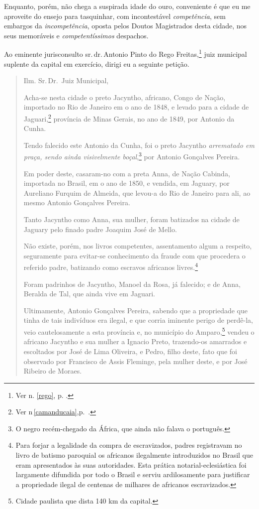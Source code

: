 Enquanto, porém, não chega a suspirada idade do ouro, conveniente é que
eu me aproveite do ensejo para tasquinhar, com incontestável
\emph{competência}, sem embargos da \emph{incompetência}, oposta pelos
Doutos Magistrados desta cidade, nos seus memoráveis e
\emph{competentíssimos} despachos.

Ao eminente jurisconsulto sr.\,dr.\,Antonio Pinto do Rego
Freitas,\footnote{Ver n. \ref{rego}, p. \pageref{rego}.}
juiz municipal suplente da capital em exercício, dirigi 
eu a seguinte petição.

\begin{quote}
Ilm. Sr.\,Dr.~Juiz Municipal,

Acha-se nesta cidade o preto Jacyntho, africano, Congo de Nação,
importado no Rio de Janeiro em o ano de 1848, e levado para a cidade de
Jaguari,\footnote{Ver n\,\ref{camanducaia},p.\,\pageref{camanducaia} .} província de Minas Gerais, no
ano de 1849, por Antonio da Cunha.

Tendo falecido este Antonio da Cunha, foi o preto Jacyntho
\emph{arrematado em praça, sendo ainda visivelmente boçal},\footnote{O
  negro recém-chegado da África, que ainda não falava o português.} por
Antonio Gonçalves Pereira.

Em poder deste, casaram-no com a preta Anna, de Nação Cabinda, importada
no Brasil, em o ano de 1850, e vendida, em Jaguary, por Aureliano
Furquim de Almeida, que levou-a do Rio de Janeiro para ali, ao mesmo
Antonio Gonçalves Pereira.

Tanto Jacyntho como Anna, sua mulher, foram batizados na cidade de
Jaguary pelo finado padre Joaquim José de Mello.

Não existe, porém, nos livros competentes, assentamento algum a
respeito, seguramente para evitar-se conhecimento da fraude com que
procedera o referido padre, batizando como escravos africanos
livres.\footnote{Para forjar a legalidade da compra de escravizados,
  padres registravam no livro de batismo paroquial os africanos
  ilegalmente introduzidos no Brasil que eram apresentados às suas
  autoridades. Esta prática notarial-eclesiástica foi largamente
  difundida por todo o Brasil e serviu ardilosamente para justificar a
  propriedade ilegal de centenas de milhares de africanos escravizados.}

Foram padrinhos de Jacyntho, Manoel da Rosa, já falecido; e de Anna,
Beralda de Tal, que ainda vive em Jaguari.

Ultimamente, Antonio Gonçalves Pereira, sabendo que a propriedade que
tinha de tais indivíduos era ilegal, e que corria iminente perigo de
perdê-la, veio cautelosamente a esta província e, no município do
Amparo,\footnote{Cidade paulista que dista 140 km da capital.} vendeu
o africano Jacyntho e sua mulher a Ignacio Preto, trazendo-os amarrados
e escoltados por José de Lima Oliveira, e Pedro, filho deste, fato que
foi observado por Francisco de Assis Fleminge, pela mulher deste, e por
José Ribeiro de Moraes.


\end{quote}
